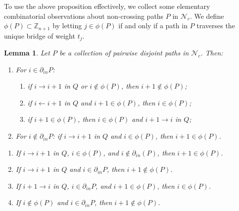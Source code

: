 \documentclass[12pt]{amsart}
\newcommand{\ZZ}{\mathbb{Z}}
\newcommand{\net}{\mathcal{N}} %
\newtheorem{lemma}[theorem]{Lemma}
\numberwithin{equation}{section}
\begin{document}
To use the above proposition effectively, we collect some elementary combinatorial observations about non-crossing paths $P$ in $\net_c$. 
We define $\phi(P) \subset \ZZ_{n+1}$ by letting $j \in \phi(P)$ if and only if a path in $P$ traverses the unique bridge of weight $t_j$.

\begin{lemma}\label{lem:phi}
  Let $P$ be a collection of pairwise disjoint paths in $\net_c$.  Then:
  \begin{enumerate}
    \item For $i\in\partial_{in}P$:
    \begin{enumerate}
      \item if $i\to i+1$ in $Q$ or $i\notin\phi(P)$, then $i+1\notin\phi(P)$;
      \item if $i\leftarrow i+1$ in $Q$ and $i+1\in\phi(P)$, then $i\in\phi(P)$;
      \item[(b')] if  $i+1\in\phi(P)$, then $i\in\phi(P)$ and $i+1\to i$ in $Q$;
    \end{enumerate}
    \item For $i\notin\partial_{in}P$: if $i\to i+1$ in $Q$ and $i\in\phi(P)$, then $i+1\in\phi(P)$.\\
  \end{enumerate}
  \begin{enumerate}
    \item If $i \to i+1$ in $Q$, $i \in \phi(P)$, and $i \notin \partial_{in}(P)$, then $i + 1 \in \phi(P)$.
    \item If $i \to i+1$ in $Q$ and $i \in \partial_{in}P$, then $i +1 \notin \phi(P)$.
    \item If $i+1 \to i$ in $Q$, $i \in \partial_{in}P$, and $i+1 \in \phi(P)$, then $i \in \phi(P)$.
    \item If $i \notin \phi(P)$ and $i \in \partial_{in}P$, then $i +1 \notin \phi(P)$.
  \end{enumerate}
\end{lemma}
\end{document}
